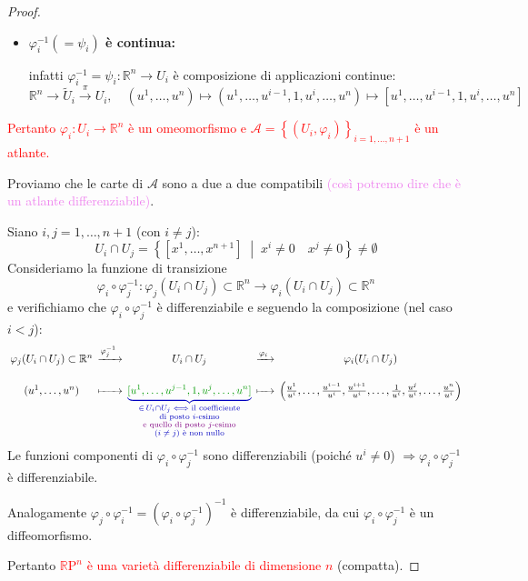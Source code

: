 \begin{proof}
\begin{itemize}
            \item \textbf{$\varphi_i^{-1} (= \psi_i)$ è continua:} 
            
            infatti $\varphi_i^{-1} = \psi_i : \mathbb{R}^n \to U_i$ è composizione di applicazioni continue:
            \[
            \mathbb{R}^n \to \tilde{U}_i \xrightarrow{\pi} U_i, \quad (u^1, \dots, u^n) \mapsto (u^1, \dots, u^{i-1}, 1, u^i, \dots, u^n) \mapsto [u^1, \dots, u^{i-1}, 1, u^i, \dots, u^n]
            \]
        \end{itemize}
        \textcolor{red}{Pertanto $\varphi_i : U_i \to \mathbb{R}^n$ è un omeomorfismo e $\mathcal{A} = \left\{ (U_i, \varphi_i) \right\}_{i=1, \dots, n+1}$ è un atlante.}

        Proviamo che le carte di $\mathcal{A}$ sono a due a due compatibili \textcolor{violet}{(così potremo dire che è un atlante differenziabile)}. 
        
        Siano $i, j = 1, \dots, n+1$ \textcolor{blu}{(con $i \neq j$)}:
        \[
        U_i \cap U_j = \left\{ [x^1, \dots, x^{n+1}] \;\middle|\; x^i \neq 0 \quad x^j \neq 0 \right\} \neq \emptyset
        \]
        Consideriamo la funzione di transizione
        \[
        \varphi_i \circ \varphi_j^{-1} : \varphi_j(U_i \cap U_j) \subset \mathbb{R}^n \to \varphi_i(U_i \cap U_j) \subset \mathbb{R}^n
        \]
        e verifichiamo che $\varphi_i \circ \varphi_j^{-1}$ è differenziabile e seguendo la composizione \textcolor{blu}{(nel caso $i < j$)}:
        \[
        {\setlength{\arraycolsep}{2.25pt}
        \begin{array}{ccccc}
        \varphi_j(U_i \cap U_j) \subset \mathbb{R}^n
            & \xrightarrow{\varphi_j^{-1}\;}
            & U_i \cap U_j
            & \xrightarrow{\varphi_i\;}
            & \varphi_i(U_i \cap U_j) \\[10pt]
        (u^1, \dots, u^n)
            & \xmapsto{\phantom{\varphi_j^{-1}}\;}
            & \textcolor{blu}{\underbrace{\textcolor{verde}{[u^1, \dots, u^{j-1}, 1, u^j, \dots, u^n]}}_{%
                \substack{\in\, U_i \cap U_j \iff \text{il coefficiente} \\
                        \text{di posto $i$-esimo} \\ \textcolor{violet}{\text{e quello di posto $j$-esimo}} \\ \text{($i \neq j$) è non nullo}}}}
            & \xmapsto{\phantom{\varphi_i}\;}
            & \left( \frac{u^1}{u^i}, \dots, \frac{u^{i-1}}{u^i}, \frac{u^{i+1}}{u^i}, \dots, \frac{1}{u^i}, \frac{u^j}{u^i}, \dots, \frac{u^n}{u^i} \right)
        \end{array}}
        \]
        Le funzioni componenti di $\varphi_i \circ \varphi_j^{-1}$ sono differenziabili \textcolor{blu}{(poiché $u^i \neq 0$)} 
        $\Rightarrow \varphi_i \circ \varphi_j^{-1}$ è differenziabile.
        
        Analogamente $\varphi_j \circ \varphi_i^{-1} = (\varphi_i \circ \varphi_j^{-1})^{-1}$ è differenziabile, da cui $\varphi_i \circ \varphi_j^{-1}$ è un diffeomorfismo.

        Pertanto \textcolor{red}{$\mathbb{R}\mathrm{P}^n$ è una varietà differenziabile di dimensione $n$} (compatta).
        \end{proof}
